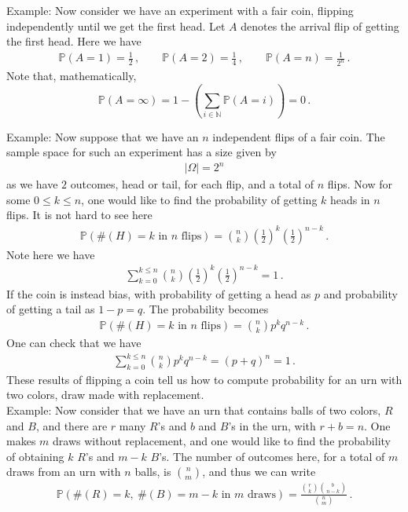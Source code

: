 \documentclass[11pt, onesided]{book}
\theoremstyle{break}
\theoremstyle{break}
\newcommand{\N}{\mathbb{N}}
\newcommand{\example}{\color{green}Example: \color{black}}
\begin{document}
\example Now consider we have an experiment with a fair coin, flipping independently until we get the first head. Let $A$ denotes the arrival flip of getting the first head. Here we have
\begin{align*}
\mathbb{P}(A = 1) = \frac{1}{2}\,, \qquad \mathbb{P}(A=2) = \frac{1}{4}\,,\qquad \mathbb{P}(A=n) = \frac{1}{2^n}\,.
\end{align*}
Note that, mathematically, 
$$\mathbb{P}(A= \infty) = 1-\left(\sum_{i\in \N} \mathbb{P}(A = i)\right) = 0\,.$$

\example Now suppose that we have an $n$ independent flips of a fair coin. The sample space for such an experiment has a size given by
\begin{align*}
|\Omega| = 2^n
\end{align*}
as we have $2$ outcomes, head or tail, for each flip, and a total of $n$ flips. Now for some $0\leq k \leq n$, one would like to find the probability of getting $k$ heads in $n$ flips. It is not hard to see here
\begin{align*}
\mathbb{P}(\#(H) = k \text{ in }n \text{ flips}) =\binom{n}{k}\left( \frac{1}{2}\right)^k \left( \frac{1}{2}\right)^{n-k} \,.
\end{align*}
Note here we have
\begin{align*}
 \sum_{k=0}^{k\leq n} \binom{n}{k} \left( \frac{1}{2}\right)^k  \left( \frac{1}{2}\right)^{n-k} = 1\,.
\end{align*}
If the coin is instead bias, with probability of getting a head as $p$ and probability of getting a tail as $1 - p = q$. The probability becomes
\begin{align*}
\mathbb{P}(\#(H) = k \text{ in }n \text{ flips}) =\binom{n}{k}p^k q^{n-k} \,.
\end{align*}
One can check that we have
\begin{align*}
\sum_{k=0}^{k\leq n} \binom{n}{k} p^k q^{n-k} = (p+q)^n = 1\,.
\end{align*}
These results of flipping a coin tell us how to compute probability for an urn with two colors, draw made with replacement. \\

\example Now consider that we have an urn that contains balls of two colors, $R$ and $B$, and there are $r$ many $R$'s and $b$ and $B$'s in the urn, with $r+b =n$. One makes $m$ draws without replacement, and one would like to find the probability of obtaining $k$ $R$'s and $m-k$ $B$'s. The number of outcomes here, for a total of $m$ draws from an urn with $n$ balls, is $\binom{n}{m}$, and thus we can write
\begin{align*}
\mathbb{P}(\#(R) = k,\ \#(B) = m-k \text{ in $m$ draws}) = \frac{\binom{r}{k}\binom{b}{n-k}}{\binom{n}{m}}\,.
\end{align*}
\end{document}

